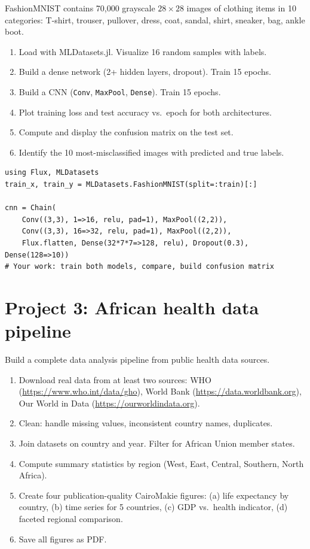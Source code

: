 FashionMNIST contains 70,000 grayscale $28\times28$ images of clothing items in 10 categories: T-shirt, trouser, pullover, dress, coat, sandal, shirt, sneaker, bag, ankle boot.

\begin{enumerate}
  \item Load with MLDatasets.jl. Visualize 16 random samples with labels.
  \item Build a dense network (2+ hidden layers, dropout). Train 15 epochs.
  \item Build a CNN (\texttt{Conv}, \texttt{MaxPool}, \texttt{Dense}). Train 15 epochs.
  \item Plot training loss and test accuracy vs.\ epoch for both architectures.
  \item Compute and display the confusion matrix on the test set.
  \item Identify the 10 most-misclassified images with predicted and true labels.
\end{enumerate}

\begin{verbatim}
using Flux, MLDatasets
train_x, train_y = MLDatasets.FashionMNIST(split=:train)[:]

cnn = Chain(
    Conv((3,3), 1=>16, relu, pad=1), MaxPool((2,2)),
    Conv((3,3), 16=>32, relu, pad=1), MaxPool((2,2)),
    Flux.flatten, Dense(32*7*7=>128, relu), Dropout(0.3), Dense(128=>10))
# Your work: train both models, compare, build confusion matrix
\end{verbatim}

\section{Project 3: African health data pipeline}

Build a complete data analysis pipeline from public health data sources.

\begin{enumerate}
  \item Download real data from at least two sources: WHO (\url{https://www.who.int/data/gho}), World Bank (\url{https://data.worldbank.org}), Our World in Data (\url{https://ourworldindata.org}).
  \item Clean: handle missing values, inconsistent country names, duplicates.
  \item Join datasets on country and year. Filter for African Union member states.
  \item Compute summary statistics by region (West, East, Central, Southern, North Africa).
  \item Create four publication-quality CairoMakie figures: (a) life expectancy by country, (b) time series for 5 countries, (c) GDP vs.\ health indicator, (d) faceted regional comparison.
  \item Save all figures as PDF.
\end{enumerate}

